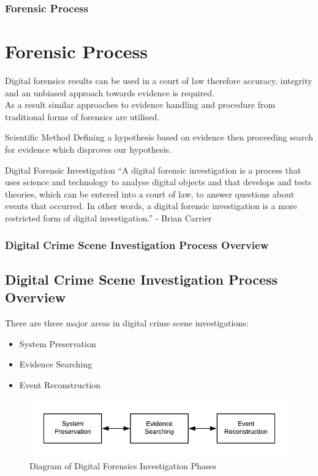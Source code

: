 \documentclass{beamer}
\begin{document}
\begin{frame}
	\frametitle{Forensic Process}
	\section{Forensic Process}
	Digital forensics results can be used in a court of law therefore accuracy, integrity and an unbiased approach towards evidence is required.\\
	As a result similar approaches to evidence handling and procedure from traditional forms of forensics are utilised.   
	\begin{block}{Scientific Method}
		Defining a hypothesis based on evidence then proceeding search for evidence which disproves our hypothesis.
	\end{block}
	\begin{block}{Digital Forensic Investigation}
	``A digital forensic investigation is a process that uses science
     and technology to analyse digital objects and that develops and
     tests theories, which can be entered into a court of law, to
     answer questions about events that occurred. In other words, a
     digital forensic investigation is a more restricted form of
     digital investigation.'' - Brian Carrier
	\end{block}
\end{frame}

\begin{frame}[fragile]
	\frametitle{Digital Crime Scene Investigation Process Overview}
	\subsection{Digital Crime Scene Investigation Process Overview}
	There are three major areas in digital crime scene investigations:
	\begin{itemize}
		\item System Preservation
		\item Evidence Searching
		\item Event Reconstruction
	\end{itemize}
	\begin{figure}
		\includegraphics[scale=1]{df-guidelines}
		\caption{Diagram of Digital Forensics Investigation Phases}
		\label{fig:df-guidelines}
	\end{figure}
\end{frame}
\end{document}
